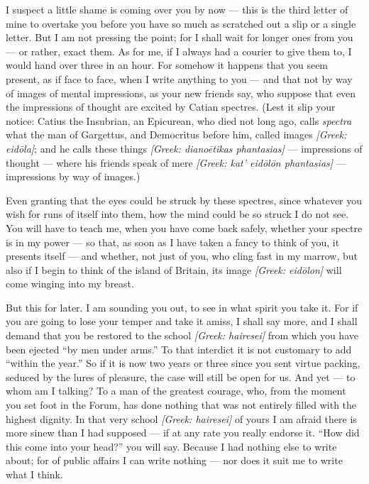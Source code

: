 

 I suspect a little shame is coming over you by now --- this is the third letter of mine to overtake you before you have so much as scratched out a slip or a single letter. But I am not pressing the point; for I shall wait for longer ones from you --- or rather, exact them. As for me, if I always had a courier to give them to, I would hand over three in an hour. For somehow it happens that you seem present, as if face to face, when I write anything to you --- and that not by way of images of mental impressions, as your new friends say, who suppose that even the impressions of thought are excited by Catian spectres. (Lest it slip your notice: Catius the Insubrian, an Epicurean, who died not long ago, calls \textit{spectra} what the man of Gargettus, and Democritus before him, called images \textit{[Greek: eidōla]}; and he calls these things \textit{[Greek: dianoētikas phantasias]} --- impressions of thought --- where his friends speak of mere \textit{[Greek: kat' eidōlōn phantasias]} --- impressions by way of images.)

 Even granting that the eyes could be struck by these spectres, since whatever you wish for runs of itself into them, how the mind could be so struck I do not see. You will have to teach me, when you have come back safely, whether your spectre is in my power --- so that, as soon as I have taken a fancy to think of you, it presents itself --- and whether, not just of you, who cling fast in my marrow, but also if I begin to think of the island of Britain, its image \textit{[Greek: eidōlon]} will come winging into my breast.

 But this for later. I am sounding you out, to see in what spirit you take it. For if you are going to lose your temper and take it amiss, I shall say more, and I shall demand that you be restored to the school \textit{[Greek: hairesei]} from which you have been ejected ``by men under arms.'' To that interdict it is not customary to add ``within the year.'' So if it is now two years or three since you sent virtue packing, seduced by the lures of pleasure, the case will still be open for us. And yet --- to whom am I talking? To a man of the greatest courage, who, from the moment you set foot in the Forum, has done nothing that was not entirely filled with the highest dignity. In that very school \textit{[Greek: hairesei]} of yours I am afraid there is more sinew than I had supposed --- if at any rate you really endorse it. ``How did this come into your head?'' you will say. Because I had nothing else to write about; for of public affairs I can write nothing --- nor does it suit me to write what I think.
